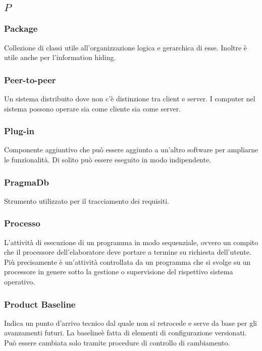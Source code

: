 \subsection*{\quad$P\quad$}
\subsubsection*{Package}
Collezione di classi utile all'organizzazione logica e gerarchica di esse. Inoltre è utile anche per l'information hiding.

\subsubsection*{Peer-to-peer}
Un sistema distribuito dove non c'è distinzione tra client e server. I computer nel sistema possono operare sia come cliente sia come server. 

\subsubsection*{Plug-in}
Componente aggiuntivo che può essere aggiunto a un'altro software per ampliarne le funzionalità. Di solito può essere eseguito in modo indipendente.

\subsubsection*{PragmaDb}
Strumento utilizzato per il tracciamento dei requisiti.


\subsubsection*{Processo}
L'attività di esecuzione di un programma in modo sequenziale, ovvero un compito che il processore dell'elaboratore deve portare a termine su richiesta dell'utente. Più precisamente è un'attività controllata da un programma che si svolge su un processore in genere sotto la gestione o supervisione del rispettivo sistema operativo.

\subsubsection*{Product Baseline}
Indica un punto d’arrivo tecnico dal quale non si retrocede e serve da base per gli avanzamenti futuri. La baseline\glosp è fatta di elementi di configurazione versionati. Può essere cambiata solo tramite procedure di controllo di cambiamento.

